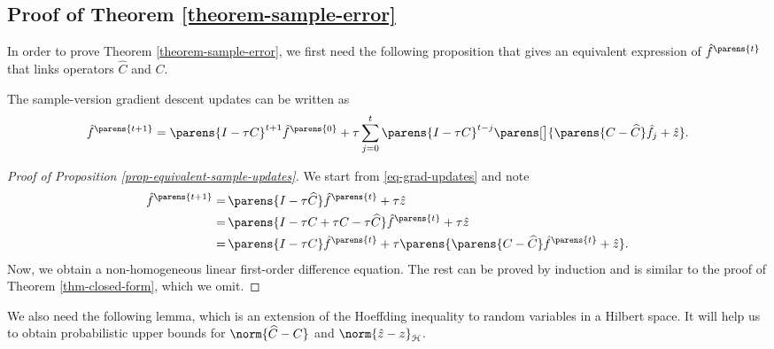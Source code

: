 \subsection{Proof of Theorem \ref{theorem-sample-error}}\label{proof-theorem-sample-error}

In order to prove Theorem \ref{theorem-sample-error}, we first need the following proposition that gives an equivalent expression of $\hat{f}^{\parens{t}}$ that links operators $\widehat{C}$ and $C$. 

\begin{proposition}\label{prop-equivalent-sample-updates}
	The sample-version gradient descent updates can be written as 
	\begin{align*}
		\hat{f}^{\parens{t+1}} = \parens{I - \tau C}^{t+1} \hat{f}^{\parens{0}} + \tau \sum_{j=0}^t \parens{I - \tau C}^{t - j} \parens[\big]{\parens{C - \widehat{C}} \hat{f}_j + \hat{z}}. 
	\end{align*}
\end{proposition}

\begin{proof}[Proof of Proposition \ref{prop-equivalent-sample-updates}]
	We start from \eqref{eq-grad-updates} and note 
	\begin{align*}
		\hat{f}^{\parens{t+1}} = & \, \parens{I - \tau \widehat{C}} \hat{f}^{\parens{t}} + \tau \hat{z} \\ 
		= & \, \parens{I - \tau C + \tau C - \tau \widehat{C}} \hat{f}^{\parens{t}} + \tau \hat{z} \\ 
		= & \, \parens{I- \tau C} \hat{f}^{\parens{t}} + \tau \parens{\parens{C - \widehat{C}} \hat{f}^{\parens{t}} + \hat{z}}. 
	\end{align*}
	Now, we obtain a non-homogeneous linear first-order difference equation. The rest can be proved by induction and is similar to the proof of Theorem \ref{thm-closed-form}, which we omit. 
\end{proof}

We also need the following lemma, which is an extension of the Hoeffding inequality to random variables in a Hilbert space. It will help us to obtain probabilistic upper bounds for $\norm{\widehat{C} - C}$ and $\norm{\hat{z} - z}_{\calH}$. 

